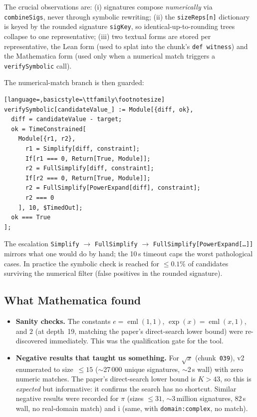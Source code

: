 \documentclass[11pt,a4paper]{article}
\theoremstyle{plain}
\theoremstyle{definition}
\newcommand{\eml}{\operatorname{eml}}
\newcommand{\imu}{\mathrm{i}}
\begin{document}
\noindent The crucial observations are: (i) signatures compose
\emph{numerically} via \texttt{combineSigs}, never through symbolic
rewriting; (ii) the \texttt{sizeReps[n]} dictionary is keyed by
the rounded signature \texttt{sigKey}, so identical-up-to-rounding trees
collapse to one representative; (iii) two textual forms are stored per
representative, the Lean form (used to splat into the chunk's
\texttt{def witness}) and the Mathematica form (used only when a
numerical match triggers a \texttt{verifySymbolic} call).

The numerical-match branch is then guarded:

\begin{lstlisting}[language=,basicstyle=\ttfamily\footnotesize]
verifySymbolic[candidateValue_] := Module[{diff, ok},
  diff = candidateValue - target;
  ok = TimeConstrained[
    Module[{r1, r2},
      r1 = Simplify[diff, constraint];
      If[r1 === 0, Return[True, Module]];
      r2 = FullSimplify[diff, constraint];
      If[r2 === 0, Return[True, Module]];
      r2 = FullSimplify[PowerExpand[diff], constraint];
      r2 === 0
    ], 10, $TimedOut];
  ok === True
];
\end{lstlisting}

The escalation \texttt{Simplify} $\to$ \texttt{FullSimplify} $\to$
\texttt{FullSimplify[PowerExpand[\dots]]} mirrors what one would do by
hand; the 10\,s timeout caps the worst pathological cases.  In practice
the symbolic check is reached for $\le 0.1\%$ of candidates surviving
the numerical filter (false positives in the rounded signature).

\subsection{What Mathematica found}

\begin{itemize}[leftmargin=*]
\item \textbf{Sanity checks.}  The constants $e=\eml(1,1)$,
$\exp(x)=\eml(x,1)$, and $2$ (at depth~19, matching the paper's
direct-search lower bound) were re-discovered immediately.  This was the
qualification gate for the tool.
\item \textbf{Negative results that taught us something.}  For
$\sqrt{x}$ (chunk~\texttt{039}), v2 enumerated to size~$\le 15$
($\sim$27\,000 unique signatures, $\sim$2\,s wall) with zero numeric
matches.  The paper's direct-search lower bound is $K>43$, so this is
\emph{expected} but informative: it confirms the search has no
shortcut.  Similar negative results were recorded for $\pi$ (sizes
$\le 31$, $\sim$3\,million signatures, 82\,s wall, no real-domain match)
and $\imu$ (same, with \texttt{domain:complex}, no match).
\end{itemize}
\end{document}
